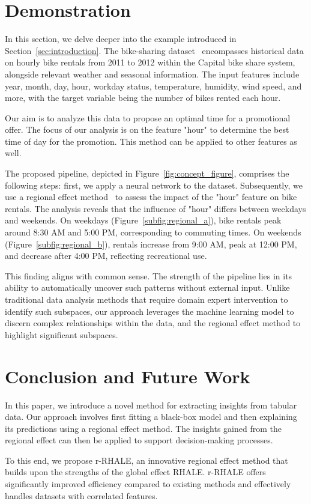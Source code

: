 \documentclass[
twocolumn,
]{ceurart}
\begin{document}
\section{Demonstration}
\label{sec:demonstration}

In this section, we delve deeper into the example introduced in Section~\ref{sec:introduction}. The bike-sharing dataset~\cite{fanaee2014event} encompasses historical data on hourly bike rentals from 2011 to 2012 within the Capital bike share system, alongside relevant weather and seasonal information. The input features include year, month, day, hour, workday status, temperature, humidity, wind speed, and more, with the target variable being the number of bikes rented each hour.

Our aim is to analyze this data to propose an optimal time for a promotional offer. The focus of our analysis is on the feature "hour" to determine the best time of day for the promotion. This method can be applied to other features as well.

The proposed pipeline, depicted in Figure~\ref{fig:concept_figure}, comprises the following steps: first, we apply a neural network to the dataset. Subsequently, we use a regional effect method~\cite{herbinger2023decomposing, herbinger_repid_2022} to assess the impact of the "hour" feature on bike rentals. The analysis reveals that the influence of "hour" differs between weekdays and weekends. On weekdays (Figure~\ref{subfig:regional_a}), bike rentals peak around 8:30 AM and 5:00 PM, corresponding to commuting times. On weekends (Figure~\ref{subfig:regional_b}), rentals increase from 9:00 AM, peak at 12:00 PM, and decrease after 4:00 PM, reflecting recreational use.

This finding aligns with common sense. The strength of the pipeline lies in its ability to automatically uncover such patterns without external input. Unlike traditional data analysis methods that require domain expert intervention to identify such subspaces, our approach leverages the machine learning model to discern complex relationships within the data, and the regional effect method to highlight significant subspaces.


\section{Conclusion and Future Work}

In this paper, we introduce a novel method for extracting insights from tabular data. Our approach involves first fitting a black-box model and then explaining its predictions using a regional effect method. The insights gained from the regional effect can then be applied to support decision-making processes.

To this end, we propose r-RHALE, an innovative regional effect method that builds upon the strengths of the global effect RHALE. r-RHALE offers significantly improved efficiency compared to existing methods and effectively handles datasets with correlated features.


\end{document}
